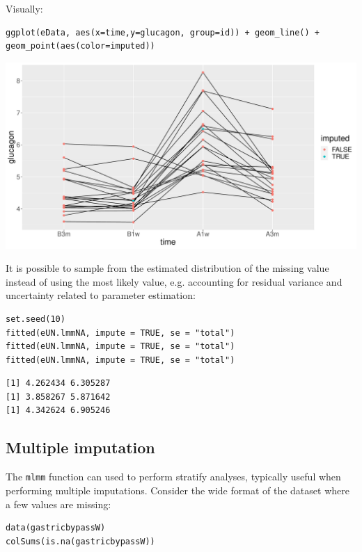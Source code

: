 \documentclass[12pt]{article}
\begin{document}
\clearpage

Visually:
\lstset{language=r,label= ,caption= ,captionpos=b,numbers=none}
\begin{lstlisting}
ggplot(eData, aes(x=time,y=glucagon, group=id)) + geom_line() + geom_point(aes(color=imputed))
\end{lstlisting}

\begin{center}
\includegraphics[trim={0 0 0 0},width=1\textwidth]{./figures/imputation.pdf}
\end{center}

It is possible to sample from the estimated distribution of the
missing value instead of using the most likely value, e.g. accounting
for residual variance and uncertainty related to parameter estimation:
\lstset{language=r,label= ,caption= ,captionpos=b,numbers=none}
\begin{lstlisting}
set.seed(10)
fitted(eUN.lmmNA, impute = TRUE, se = "total")
fitted(eUN.lmmNA, impute = TRUE, se = "total")
fitted(eUN.lmmNA, impute = TRUE, se = "total")
\end{lstlisting}

\begin{verbatim}
[1] 4.262434 6.305287
[1] 3.858267 5.871642
[1] 4.342624 6.905246
\end{verbatim}

\subsection{Multiple imputation}
\label{sec:org55403b4}

The \texttt{mlmm} function can used to perform stratify analyses, typically
useful when performing multiple imputations. Consider the wide format
of the dataset where a few values are missing:
\lstset{language=r,label= ,caption= ,captionpos=b,numbers=none}
\begin{lstlisting}
data(gastricbypassW)
colSums(is.na(gastricbypassW))
\end{lstlisting}
\end{document}
